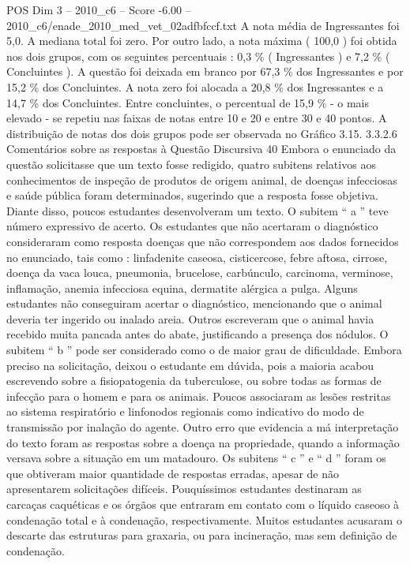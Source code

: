\begin{textsample}{POS Dim 3 – 2010\_c6 – Score -6.00 – 2010\_c6/enade\_2010\_med\_vet\_02adfbfccf.txt}
A nota média de Ingressantes foi 5,0.
A mediana total foi zero.
Por outro lado, a nota máxima ( 100,0 ) foi obtida nos dois grupos, com os seguintes percentuais : 0,3 \% ( Ingressantes ) e 7,2 \% ( Concluintes ).
A questão foi deixada em branco por 67,3 \% dos Ingressantes e por 15,2 \% dos Concluintes.
A nota zero foi alocada a 20,8 \% dos Ingressantes e a 14,7 \% dos Concluintes.
Entre concluintes, o percentual de 15,9 \% - o mais elevado - se repetiu nas faixas de notas entre 10 e 20 e entre 30 e 40 pontos.
A distribuição de notas dos dois grupos pode ser observada no Gráfico 3.15. 3.3.2.6 Comentários sobre as respostas à Questão Discursiva 40 Embora o enunciado da questão solicitasse que um texto fosse redigido, quatro subitens relativos aos conhecimentos de inspeção de produtos de origem animal, de doenças infecciosas e saúde pública foram determinados, sugerindo que a resposta fosse objetiva.
Diante disso, poucos estudantes desenvolveram um texto.
O subitem “ a ” teve número expressivo de acerto.
Os estudantes que não acertaram o diagnóstico consideraram como resposta doenças que não correspondem aos dados fornecidos no enunciado, tais como : linfadenite caseosa, cisticercose, febre aftosa, cirrose, doença da vaca louca, pneumonia, brucelose, carbúnculo, carcinoma, verminose, inflamação, anemia infecciosa equina, dermatite alérgica a pulga.
Alguns estudantes não conseguiram acertar o diagnóstico, mencionando que o animal deveria ter ingerido ou inalado areia.
Outros escreveram que o animal havia recebido muita pancada antes do abate, justificando a presença dos nódulos.
O subitem “ b ” pode ser considerado como o de maior grau de dificuldade.
Embora preciso na solicitação, deixou o estudante em dúvida, pois a maioria acabou escrevendo sobre a fisiopatogenia da tuberculose, ou sobre todas as formas de infecção para o homem e para os animais.
Poucos associaram as lesões restritas ao sistema respiratório e linfonodos regionais como indicativo do modo de transmissão por inalação do agente.
Outro erro que evidencia a má interpretação do texto foram as respostas sobre a doença na propriedade, quando a informação versava sobre a situação em um matadouro.
Os subitens “ c ” e “ d ” foram os que obtiveram maior quantidade de respostas erradas, apesar de não apresentarem solicitações difíceis.
Pouquíssimos estudantes destinaram as carcaças caquéticas e os órgãos que entraram em contato com o líquido caseoso à condenação total e à condenação, respectivamente.
Muitos estudantes acusaram o descarte das estruturas para graxaria, ou para incineração, mas sem definição de condenação.

\end{textsample}
